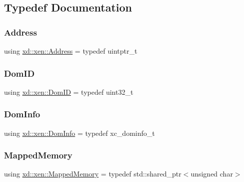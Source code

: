 \subsection{Typedef Documentation}
\mbox{\label{namespacexd_1_1xen_a94a8d6c9448e8330c771c100dba152c3}} 
\subsubsection{\texorpdfstring{Address}{Address}}
{\footnotesize\ttfamily using \mbox{\hyperlink{namespacexd_1_1xen_a94a8d6c9448e8330c771c100dba152c3}{xd\+::xen\+::\+Address}} = typedef uintptr\+\_\+t}

\mbox{\label{namespacexd_1_1xen_aaad6b5eb6f7e5ba76a4e4ca166ac8a08}} 
\subsubsection{\texorpdfstring{Dom\+ID}{DomID}}
{\footnotesize\ttfamily using \mbox{\hyperlink{namespacexd_1_1xen_aaad6b5eb6f7e5ba76a4e4ca166ac8a08}{xd\+::xen\+::\+Dom\+ID}} = typedef uint32\+\_\+t}

\mbox{\label{namespacexd_1_1xen_a60588fc8910b3e8b14ac3d51e5de41ba}} 
\subsubsection{\texorpdfstring{Dom\+Info}{DomInfo}}
{\footnotesize\ttfamily using \mbox{\hyperlink{namespacexd_1_1xen_a60588fc8910b3e8b14ac3d51e5de41ba}{xd\+::xen\+::\+Dom\+Info}} = typedef xc\+\_\+dominfo\+\_\+t}

\mbox{\label{namespacexd_1_1xen_ac9cd783e07e8d847ac0805eec3536746}} 
\subsubsection{\texorpdfstring{Mapped\+Memory}{MappedMemory}}
{\footnotesize\ttfamily using \mbox{\hyperlink{namespacexd_1_1xen_ac9cd783e07e8d847ac0805eec3536746}{xd\+::xen\+::\+Mapped\+Memory}} = typedef std\+::shared\+\_\+ptr$<$unsigned char$>$}

